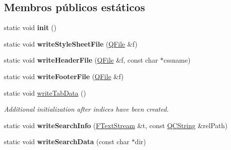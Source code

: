 \subsection*{Membros públicos estáticos}
\begin{DoxyCompactItemize}
\item 
\hypertarget{class_html_generator_a02fd73d861ef2e4aabb38c0c9ff82947}{static void {\bfseries init} ()}\label{class_html_generator_a02fd73d861ef2e4aabb38c0c9ff82947}

\item 
\hypertarget{class_html_generator_a7514095bf4f9d60188adb23a9ac59589}{static void {\bfseries write\-Style\-Sheet\-File} (\hyperlink{class_q_file}{Q\-File} \&f)}\label{class_html_generator_a7514095bf4f9d60188adb23a9ac59589}

\item 
\hypertarget{class_html_generator_a847f8381b1254e8544ec3295757f2601}{static void {\bfseries write\-Header\-File} (\hyperlink{class_q_file}{Q\-File} \&f, const char $\ast$cssname)}\label{class_html_generator_a847f8381b1254e8544ec3295757f2601}

\item 
\hypertarget{class_html_generator_a51e7cc306518949f9b2166187b5154c8}{static void {\bfseries write\-Footer\-File} (\hyperlink{class_q_file}{Q\-File} \&f)}\label{class_html_generator_a51e7cc306518949f9b2166187b5154c8}

\item 
\hypertarget{class_html_generator_a7274b2e58ba353281f0ee2c80f89e696}{static void \hyperlink{class_html_generator_a7274b2e58ba353281f0ee2c80f89e696}{write\-Tab\-Data} ()}\label{class_html_generator_a7274b2e58ba353281f0ee2c80f89e696}

\begin{DoxyCompactList}\small\item\em Additional initialization after indices have been created. \end{DoxyCompactList}\item 
\hypertarget{class_html_generator_a93c7e1e5d04469009ed7d692a29e6dee}{static void {\bfseries write\-Search\-Info} (\hyperlink{class_f_text_stream}{F\-Text\-Stream} \&t, const \hyperlink{class_q_c_string}{Q\-C\-String} \&rel\-Path)}\label{class_html_generator_a93c7e1e5d04469009ed7d692a29e6dee}

\item 
\hypertarget{class_html_generator_a0728833314255c89fef66380ba55a761}{static void {\bfseries write\-Search\-Data} (const char $\ast$dir)}\label{class_html_generator_a0728833314255c89fef66380ba55a761}


\end{DoxyCompactItemize}
